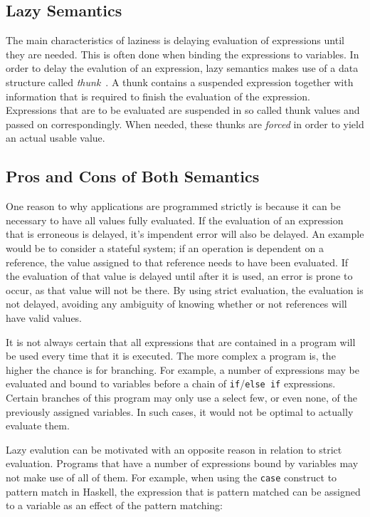 \subsection{Lazy Semantics}
\label{back:lazySem}
The main characteristics of laziness is delaying evaluation of expressions
until they are needed. This is often done when binding the expressions to
variables. In order to delay the evalution of an expression, lazy semantics
makes use of a data structure called
\textit{thunk}~\cite{Ennals:2003:OEA:944746.944731}. A thunk contains a
suspended expression together with information that is required to finish the
evaluation of the expression. Expressions that are to be
evaluated are suspended in so called thunk values and passed on correspondingly.
When needed, these thunks are \textit{forced} in order to yield an actual usable value.

\subsection{Pros and Cons of Both Semantics}
One reason to why applications are programmed strictly is because it can be
necessary to have all values fully evaluated. If the evaluation of an expression
that is erroneous is delayed, it's impendent error will also be delayed.
An example would be to consider a stateful system; if an operation is dependent
on a reference, the value assigned to that reference needs to have been
evaluated. If the evaluation of that value is delayed until after it is used,
an error is prone to occur, as that value will not be there.
By using strict evaluation, the evaluation is not delayed, avoiding any
ambiguity of knowing whether or not references will have valid values.

It is not always certain that all expressions that are contained in a program
will be used every time that it is executed. The more complex a program is, the
higher the chance is for branching. For example, a number of expressions may
be evaluated and bound to variables before a chain of
\texttt{if}/\texttt{else if} expressions. Certain branches of this program may
only use a select few, or even none, of the previously assigned variables.
In such cases, it would not be optimal to actually evaluate them.

Lazy evalution can be motivated with an opposite reason in relation to strict
evaluation. Programs that have a number of expressions bound by variables may
not make use of all of them. For example, when using the \texttt{case} construct
to pattern match in Haskell, the expression that is pattern matched can be
assigned to a variable as an effect of the pattern matching:

